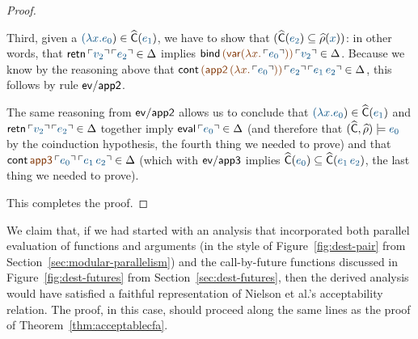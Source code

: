 \begin{proof}
\begin{itemize}
  \medskip Third, given a $\obj{(\lambda x.e_0}) \in \widehat{\sf
    C}(\obj{e_1})$, we have to show that $(\widehat{\sf C}(\obj{e_2})
  \subseteq \widehat{\rho}(\obj{x}))$: in other words, that ${\sf
    retn}\,\interp{v_2}\,\interp{e_2} \in \Delta$ implies ${\sf
    bind}\,\lf{({\sf var}(\lambda x.\,\interp{e_0}))}\,\interp{v_2}
  \in \Delta$.  Because we know by the reasoning above that ${\sf
    cont}\,\lf{({\sf app2}\,(\lf \lambda
    x.\,\interp{e_0}))}\,\interp{e_2}\,\interp{e_1\,e_2} \in \Delta$, this
  follows by rule ${\sf ev/app2}$. 

  \medskip The same reasoning from ${\sf ev/app2}$ 
   allows us to conclude that $\obj{(\lambda
    x.e_0}) \in \widehat{\sf C}(\obj{e_1})$ and ${\sf
    retn}\,\interp{v_2}\,\interp{e_2} \in \Delta$ together imply ${\sf
    eval}\,\interp{e_0} \in \Delta$ (and therefore that $(\widehat{\sf
    C}, \widehat{\rho}) \models \obj{e_0}$ by the coinduction
  hypothesis, the fourth thing we needed to prove) and that ${\sf
    cont}\,\lf{\sf app3}\,\interp{e_0}\,\interp{e_1\,e_2} \in \Delta$ (which
  with ${\sf ev/app3}$ implies $\widehat{\sf C}(\obj{e_0}) \subseteq
  \widehat{\sf C}(\obj{e_1\,e_2})$, the last thing we needed to
  prove).
  \end{itemize}

\noindent
This completes the proof.
\end{proof}

We claim that, if we had started with an analysis that incorporated
both parallel evaluation of functions and arguments (in the style of
Figure~\ref{fig:dest-pair} from Section~\ref{sec:modular-parallelism})
and the call-by-future functions discussed in
Figure~\ref{fig:dest-futures} from Section~\ref{sec:dest-futures},
then the derived analysis would have satisfied a faithful
representation of Nielson et al.'s acceptability relation. The proof,
in this case, should proceed along the same lines as the proof of
Theorem~\ref{thm:acceptablecfa}.




